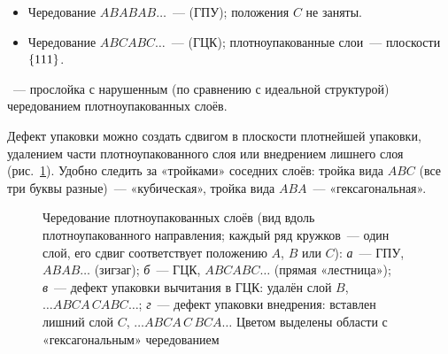 \begin{itemize}
\item Чередование $ABABAB\ldots$~— 
(ГПУ); положения $C$ не заняты.
\item Чередование $ABCABC\ldots$~— 
(ГЦК); плотноупакованные слои~— плоскости $\{111\}$.
\end{itemize}

\begin{opredelenie}
~— прослойка с нарушенным (по сравнению с
идеальной структурой) чередованием плотноупакованных слоёв.
\end{opredelenie}

Дефект упаковки можно создать сдвигом в плоскости плотнейшей упаковки,
удалением части плотноупакованного слоя или внедрением лишнего слоя
(рис.~\ref{fig:stacking}). Удобно следить за «тройками» соседних слоёв:
тройка вида $ABC$ (все три буквы разные)~— «кубическая», тройка вида
$ABA$~— «гексагональная».

\begin{figure}[ht]
\centering
{}
\caption{Чередование плотноупакованных слоёв (вид вдоль плотноупакованного
направления; каждый ряд кружков~— один слой, его сдвиг соответствует
положению $A$, $B$ или $C$): \textit{а}~— ГПУ, $ABAB\ldots$ (зигзаг);
\textit{б}~— ГЦК, $ABCABC\ldots$ (прямая «лестница»);
\textit{в}~— дефект упаковки вычитания в ГЦК: удалён слой $B$,
$\ldots ABCA\,CABC\ldots$; \textit{г}~— дефект упаковки внедрения:
вставлен лишний слой $C$, $\ldots ABCA\,C\,BCA\ldots$ Цветом выделены
области с «гексагональным» чередованием}
\label{fig:stacking}
\end{figure}

